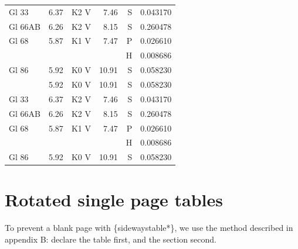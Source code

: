 \documentclass{aa}
\begin{document}
\begin{appendix}
\begin{longtable}{lllrrr}
Gl 33    & 6.37 & K2 V & 7.46 & S & 0.043170\\
Gl 66AB  & 6.26 & K2 V & 8.15 & S & 0.260478\\
Gl 68    & 5.87 & K1 V & 7.47 & P & 0.026610\\
         &      &      &      & H & 0.008686\\
Gl 86    & 5.92 & K0 V & 10.91& S & 0.058230\\            & 5.92 & K0 V & 10.91& S & 0.058230\\
Gl 33    & 6.37 & K2 V & 7.46 & S & 0.043170\\
Gl 66AB  & 6.26 & K2 V & 8.15 & S & 0.260478\\
Gl 68    & 5.87 & K1 V & 7.47 & P & 0.026610\\
         &      &      &      & H & 0.008686\\
Gl 86    & 5.92 & K0 V & 10.91& S & 0.058230\\   
\end{longtable}


\FloatBarrier %
\twocolumn
\begin{table}
\section{Rotated single page tables}
To prevent a blank page with \{sidewaystable*\}, we use the method
described in appendix B: declare the table first, and the section second.
%


\end{table}
\end{appendix}
\end{document}
